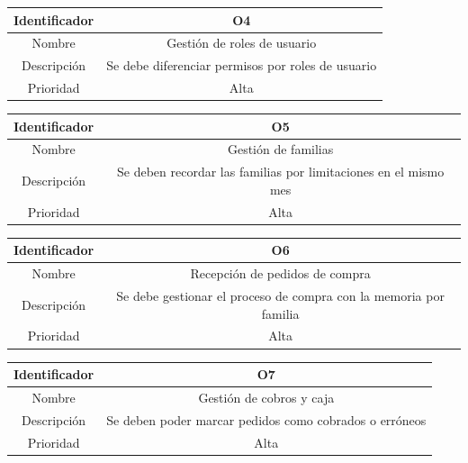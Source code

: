 \vspace{1em}
\par
\begin{tabular}{||c|c||} 
\hline
Identificador & O4 \\ [0.5ex] 
\hline\hline
Nombre & Gestión de roles de usuario \\ 
\hline
Descripción & Se debe diferenciar permisos por roles de usuario \\
\hline
Prioridad & Alta \\ [1ex] 
\hline
\end{tabular}

\vspace{1em}
\par
\begin{tabular}{||c|c||} 
\hline
Identificador & O5 \\ [0.5ex] 
\hline\hline
Nombre & Gestión de familias \\ 
\hline
Descripción & Se deben recordar las familias por limitaciones en el mismo mes \\
\hline
Prioridad & Alta \\ [1ex] 
\hline
\end{tabular}

\vspace{1em}
\par
\begin{tabular}{||c|c||} 
\hline
Identificador & O6 \\ [0.5ex] 
\hline\hline
Nombre & Recepción de pedidos de compra \\ 
\hline
Descripción & Se debe gestionar el proceso de compra con la memoria por familia \\
\hline
Prioridad & Alta \\ [1ex] 
\hline
\end{tabular}


\vspace{1em}
\par
\begin{tabular}{||c|c||} 
\hline
Identificador & O7 \\ [0.5ex] 
\hline\hline
Nombre & Gestión de cobros y caja \\ 
\hline
Descripción & Se deben poder marcar pedidos como cobrados o erróneos \\
\hline
Prioridad & Alta \\ [1ex] 
\hline
\end{tabular}


